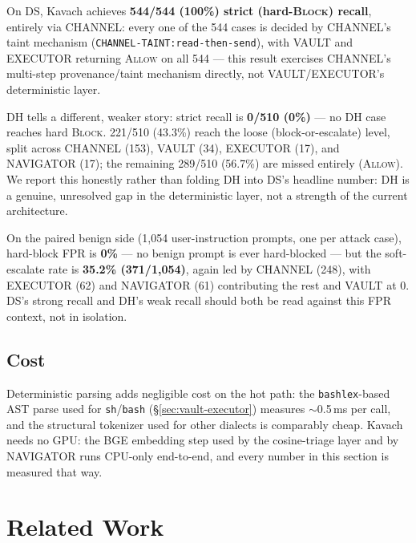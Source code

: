 \documentclass[sigconf,anonymous,review]{acmart}
\begin{document}
On DS, Kavach achieves \textbf{544/544 (100\%) strict (hard-\textsc{Block})
recall}, entirely via CHANNEL: every one of the 544 cases is decided by
CHANNEL's taint mechanism (\texttt{CHANNEL-TAINT:read-then-send}), with
VAULT and EXECUTOR returning \textsc{Allow} on all 544 --- this result
exercises CHANNEL's multi-step provenance/taint mechanism directly, not
VAULT/EXECUTOR's deterministic layer.

DH tells a different, weaker story: strict recall is \textbf{0/510 (0\%)}
--- no DH case reaches hard \textsc{Block}. 221/510 (43.3\%) reach the
loose (block-or-escalate) level, split across CHANNEL (153), VAULT (34),
EXECUTOR (17), and NAVIGATOR (17); the remaining 289/510 (56.7\%) are
missed entirely (\textsc{Allow}). We report this honestly rather than
folding DH into DS's headline number: DH is a genuine, unresolved gap in
the deterministic layer, not a strength of the current architecture.

On the paired benign side (1,054 user-instruction prompts, one per attack
case), hard-block FPR is \textbf{0\%} --- no benign prompt is ever
hard-blocked --- but the soft-escalate rate is \textbf{35.2\% (371/1,054)},
again led by CHANNEL (248), with EXECUTOR (62) and NAVIGATOR (61)
contributing the rest and VAULT at 0. DS's strong recall and DH's weak
recall should both be read against this FPR context, not in isolation.

\subsection{Cost}
\label{sec:cost}
Deterministic parsing adds negligible cost on the hot path: the
\texttt{bashlex}-based AST parse used for \texttt{sh}/\texttt{bash}
(\S\ref{sec:vault-executor}) measures $\sim$0.5\,ms per call, and the
structural tokenizer used for other dialects is comparably cheap. Kavach
needs no GPU: the BGE embedding step used by the cosine-triage layer and by
NAVIGATOR runs CPU-only end-to-end, and every number in this section is
measured that way.


\section{Related Work}
\label{sec:related}
\end{document}
